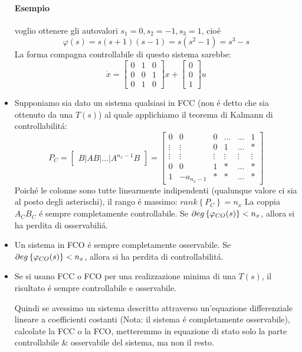 \documentclass[../main.tex]{subfiles}
\begin{document}
\begin{itemize}
				\paragraph{Esempio} voglio ottenere gli autovalori $ s_1 = 0, s_2 = -1, s_3 = 1 $, cio\'e
					\[
						\varphi(s) = s(s+1)(s-1) = s(s^2-1) = s^3 - s
					\]
					La forma compagna controllabile di questo sistema sarebbe:
					\[
						\dot x =
						\begin{bmatrix}
							0 & 1 & 0\\
							0 & 0 & 1\\
							0 & 1 & 0
						\end{bmatrix} x+
						\begin{bmatrix}
							0\\
							0\\
							1
						\end{bmatrix} u
					\]
			\item 
				Supponiamo sia dato un sistema qualsiasi in FCC (non \'e detto che sia ottenuto da una $ T(s) $) al quale applichiamo il teorema di Kalmann di controllabilit\'a:
				\[
					P_C =
					\begin{bmatrix}
						B | AB | \dots | A^{n_x-1}B
					\end{bmatrix} =
					\begin{bmatrix}
						0 		& 0 		& 0 		& \dots 	& \dots 	& 1\\
						\vdots 	& \vdots 	& 0			& 1 		& \dots		& *\\
						\vdots 	& \vdots	& \vdots	& \vdots	& \vdots	& \vdots\\
						0 		& 0 		& 1 		& *		 	& \dots 	& *\\
						1 		& -a_{n_x-1} & * 		& * 	& \dots		& *
					\end{bmatrix}
				\]
				Poich\'e le colonne sono tutte linearmente indipendenti (qualunque valore ci sia al posto degli asterischi), il rango \'e massimo: $ rank \left\lbrace P_C \right\rbrace = n_x $ 
				La coppia $ A_C B_C $ \'e sempre completamente controllabile. Se $ \partial eg \left\lbrace \varphi_{CO}(s) \right\rbrace < n_x $, allora si ha perdita di osservabili\'a.
			\item 
				Un sistema in FCO \'e sempre completamente osservabile. Se  $ \partial eg \left\lbrace \varphi_{CO}(s) \right\rbrace < n_x $, allora si ha perdita di controllabilit\'a.
			\item 
				Se si usano FCC o FCO per una realizzazione minima di una $ T(s) $, il risultato \'e sempre controllabile e osservabile.
				
				Quindi se avessimo un sistema descritto attraverso un'equazione differenziale lineare a coefficienti costanti (Nota: il sistema \'e completamente osservabile), calcolate la FCC o la FCO, metteremmo in equazione di stato solo la parte controllabile \& osservabile del sistema, ma non il resto.
		\end{itemize}
\end{document}
